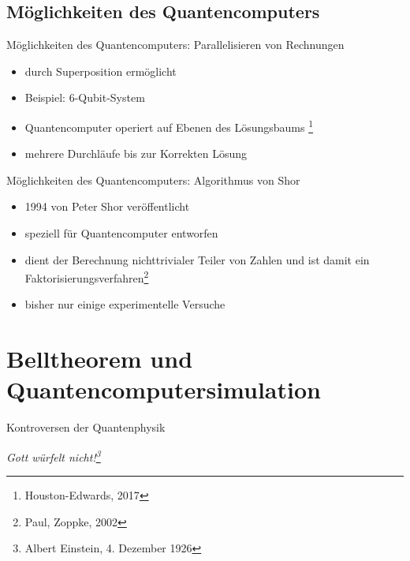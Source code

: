 \documentclass[]{beamer}
\begin{document}
\subsection{Möglichkeiten des Quantencomputers}

\begin{frame}{Möglichkeiten des Quantencomputers: Parallelisieren von Rechnungen}
\begin{center}
	\begin{itemize}
	\item durch Superposition ermöglicht
	\item Beispiel: 6-Qubit-System
    \item Quantencomputer operiert auf Ebenen des Lösungsbaums \footnote{Houston-Edwards, 2017}
    \item mehrere Durchläufe bis zur Korrekten Lösung

	\end{itemize}
\end{center}
\end{frame}

\begin{frame}{Möglichkeiten des Quantencomputers: Algorithmus von Shor}
\begin{center}
	\begin{itemize}
	\item 1994 von Peter Shor veröffentlicht
    \item speziell für Quantencomputer entworfen
    \item dient der Berechnung nichttrivialer Teiler von Zahlen und ist damit ein Faktorisierungsverfahren\footnote{Paul, Zoppke, 2002}
    \item bisher nur einige experimentelle Versuche

	\end{itemize}
\end{center}
\end{frame}

\section{Belltheorem und Quantencomputersimulation}

\begin{frame}{Kontroversen der Quantenphysik}
\begin{center}
	\begin{huge}
	\textit{\glqq Gott würfelt nicht!\grqq{}\hspace{1mm}\footnote{Albert Einstein, 4. Dezember 1926}}
	\end{huge}
\end{center}
\end{frame}
\end{document}
